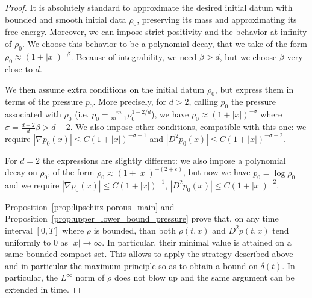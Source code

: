 \documentclass[11pt,a4paper]{article}
\numberwithin{equation}{section}
\theoremstyle{plain}
\theoremstyle{remark}
\begin{document}
\begin{proof}
It is absolutely standard to approximate the desired initial datum with bounded and smooth initial data $\rho_0$, preserving its mass and approximating its free energy. Moreover, we can impose strict positivity and the behavior at infinity of $\rho_0$. We choose this behavior to be a polynomial decay, that we take of the form $\rho_0\approx (1+|x|)^{-\beta}$. Because of integrability, we need $\beta>d$, but we choose $\beta$ very close to $d$. 

We then assume extra conditions on the initial datum $\rho_0$, but express them in terms of the pressure $p_0$. 
More precisely, for $d>2$, calling $p_0$ the pressure associated with $\rho_0$ (i.e. $p_0=\frac{m}{m-1}\rho_0^{1-2/d}$), we have $p_0\approx (1+|x|)^{-\sigma}$ where $\sigma=\frac{d-2}{d}\beta>d-2 $. We also impose other conditions, compatible with this one: we require $|\nabla p_0(x)|\leq C(1+|x|)^{-\sigma-1}$ and $|D^2 p_0(x)|\leq C(1+|x|)^{-\sigma-2}$. 

For $d=2$ the expressions are slightly different: we also impose a polynomial decay on $\rho_0$, of the form $\rho_0\approx (1+|x|)^{-(2+\varepsilon)}$, but now we have $p_0=\log\rho_0$ and we require $|\nabla p_0(x)|\leq C(1+|x|)^{-1}$, $|D^2 p_0(x)|\leq C(1+|x|)^{-2}$. 

Proposition~\ref{prop:lipschitz-porous_main} and  Proposition~\ref{prop:upper_lower_bound_pressure}  prove that, on any time interval $[0,T]$ where $\rho$ is bounded, than both $\rho(t,x)$ and $D^2p(t,x)$ tend uniformly to $0$ as $|x|\to\infty$. In particular, their minimal value is attained on a same bounded compact set. This allows to apply the strategy described above and in particular the maximum principle so as to obtain a bound on $\delta(t)$. In particular, the $L^\infty$ norm of $\rho$ does not blow up and the same argument can be extended in time.
\end{proof}


\end{document}
